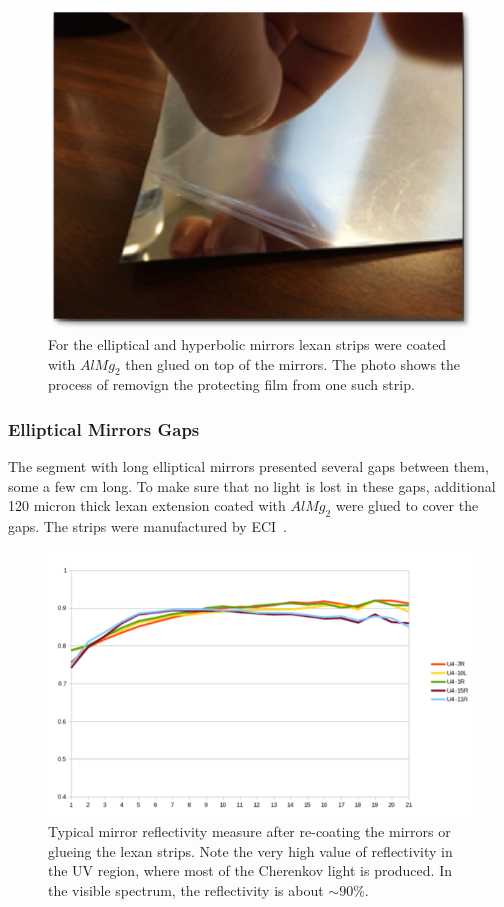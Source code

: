\begin{figure}[h]
\centering
	\includegraphics[width=0.98\columnwidth,keepaspectratio]{img/filmOnStrip.png}
	\caption{For the elliptical and hyperbolic mirrors lexan strips were coated with $AlMg_2$ then glued on top of the mirrors. The photo shows
            the process of removign the protecting film from one such strip.}
	\label{fig:filmOnStrip}
\end{figure}


\subsubsection{Elliptical Mirrors Gaps}

The segment with long elliptical mirrors presented several gaps between them, some a few cm long. To make sure that no light is lost in these gaps,
additional 120 micron thick lexan extension coated with $AlMg_2$ were glued to cover the gaps. The strips were manufactured by ECI~\cite{ECI}.


\begin{figure}[h]
\centering
	\includegraphics[width=0.95\columnwidth,keepaspectratio]{img/mirrorsReflectivityAfter.png}
	\caption{Typical mirror reflectivity measure after re-coating the mirrors or glueing the lexan strips. Note the very high value of reflectivity
            in the UV region, where most of the Cherenkov light is produced. In the visible spectrum, the reflectivity is about $\sim 90\%$.}
	\label{fig:reflectivityAfter}
\end{figure}


